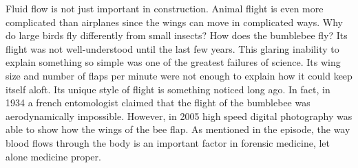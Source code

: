 Fluid flow is not just important in construction. Animal flight is even more complicated than airplanes since the wings can move in complicated ways. Why do large birds fly differently from small insects?  How does the bumblebee fly? Its flight was not well-understood until the last few years. This glaring inability to explain something so simple was one of the greatest failures of science. Its wing size and number of flaps per minute were not enough to explain how it could keep itself aloft. Its unique style of flight is something noticed long ago. In fact, in 1934 a french entomologist claimed that the flight of the bumblebee was aerodynamically impossible. However, in 2005 high speed digital photography was able to show how the wings of the bee flap. As mentioned in the episode, the way blood flows through the body is an important factor in forensic medicine, let alone medicine proper.

